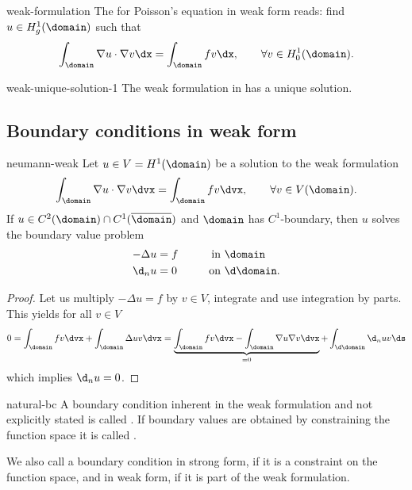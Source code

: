\begin{Definition}{weak-formulation}
  The  for Poisson's equation in weak form
  reads: find $u\in H^1_g(\domain)$ such that
  \begin{gather}
    \int_{\domain} \nabla u\cdot\nabla v \dx
    = \int_{\domain} fv\dx, \qquad\forall v\in H^1_0(\domain).
  \end{gather}
\end{Definition}

\begin{Theorem}{weak-unique-solution-1}
  The weak formulation in  has
  a unique solution.
\end{Theorem}

\subsection{Boundary conditions in weak form}

\begin{Example}{neumann-weak}
  Let $u\in V=H^1(\domain)$ be a solution to the weak formulation
  \begin{gather}
    \label{eq:neumann-weak-formulation}
    \int_{\domain} \nabla u\cdot\nabla v \dvx
    = \int_{\domain} fv\dvx, \qquad\forall v\in V(\domain).
  \end{gather}
  If $u\in C^2(\domain) \cap C^1(\overline{\domain})$ and $\domain$
  has $C^1$-boundary, then $u$ solves the boundary value problem
  \begin{gather}
    \begin{aligned}
      -\Delta u &= f &\qquad \text{in } &\domain\\
      \d_n u &= 0 &\text{on } &\d\domain.
    \end{aligned}
  \end{gather}
\end{Example}

\begin{proof}
  Let us multiply $-\Delta u=f$ by $v\in V$, integrate and use
  integration by parts. This yields for all $v\in V$
  \begin{align*}
    0 = \int_\domain f v \dvx + \int_\domain \Delta u v \dvx
    = \underbrace{\int_\domain f v \dvx - \int_\domain \nabla u \nabla v \dvx}_{=0} + \int_{\d\domain} \d_n u v \ds
  \end{align*}
  which implies $\d_n u = 0$.
\end{proof}

\begin{Definition}{natural-bc}
  A boundary condition inherent in the weak formulation and not
  explicitly stated is called . If
  boundary values are obtained by constraining the function space it
  is called .

  We also call a boundary condition in strong form, if it is a
  constraint on the function space, and in weak form, if it is part of
  the weak formulation.
\end{Definition}


